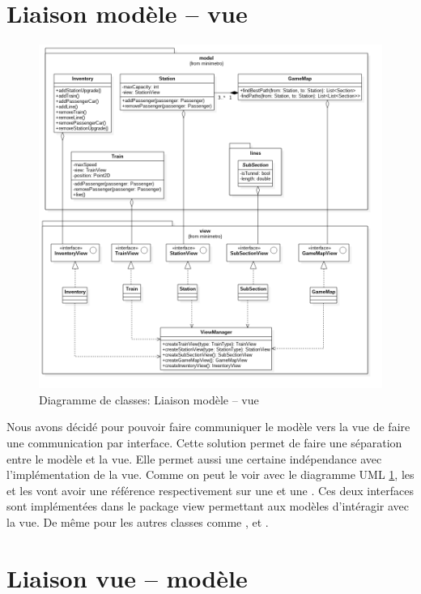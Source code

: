 \documentclass[report, backcover, french, nodocumentinfo]{upmethodology-document}
\begin{document}
		\section{Liaison modèle -- vue}
			\begin{figure}[h!]
				\centering
				\includegraphics[width=\textwidth]{figures/ModelViewLinkClassDiagram}
				\caption{Diagramme de classes: Liaison modèle -- vue}
				\label{fig:ModelViewLinkClassDiagram}
			\end{figure}
				Nous avons décidé pour pouvoir faire communiquer le modèle vers la vue de faire une communication par interface. Cette solution permet de faire une séparation entre le modèle et la vue. Elle permet aussi une certaine indépendance avec l'implémentation de la vue.
				Comme on peut le voir avec le diagramme UML \ref{fig:ModelViewLinkClassDiagram}, les  et les  vont avoir une référence respectivement sur une  et une . Ces deux interfaces sont implémentées dans le package view permettant aux modèles d'intéragir avec la vue. De même pour les autres classes comme ,  et .
		\section{Liaison vue -- modèle}
\end{document}
